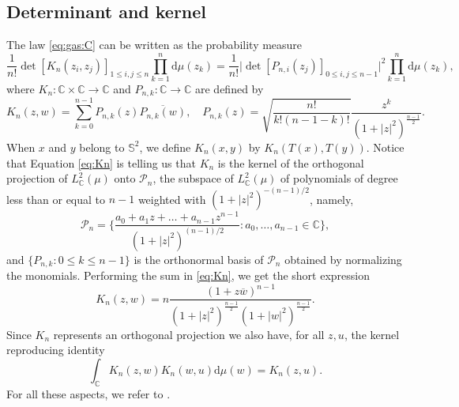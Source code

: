 \documentclass[10pt,reqno]{amsart}
\numberwithin{equation}{section}
\numberwithin{figure}{section}
\theoremstyle{plain}
\newcommand{\<}{\langle}
\renewcommand{\>}{\rangle}
\begin{document}
\subsection{Determinant and kernel}

The law \eqref{eq:gas:C} can be written as the probability measure
\begin{equation}
  \frac{1}{n!}\det{[K_n(z_i,z_j)]}_{1\leq i,j\leq n}\prod_{k=1}^n\mathrm{d}\mu(z_k)
  =
  \frac{1}{n!} 
  \Big|
  \det{[P_{n,i}(z_j)]}_{0\leq i,j\leq n-1}
  \Big|^2\prod_{k=1}^n\mathrm{d}\mu(z_k),
\end{equation}
where $K_n: \mathbb C \times \mathbb C \to \mathbb C$
and $P_{n,k}: \mathbb C \to \mathbb C$ are defined by
\begin{equation}\label{eq:Kn}
  K_n(z,w)=\sum_{k=0}^{n-1}
  P_{n,k}(z)\overline{P_{n,k}(w)},
  \quad
  P_{n,k}(z)=\sqrt{\frac{n!}{k!(n-1-k)!}}\frac{z^k}{(1+|z|^2)^{\frac{n-1}{2}}}.
\end{equation}
When $x$ and $y$ belong to $\mathbb S^2$,
we define $K_n(x,y)$
by $K_n(T(x),T(y))$.
Notice that Equation \eqref{eq:Kn} 
is telling us that $K_n$ is the kernel of 
the orthogonal projection
of $L^2_{\mathbb{C}}(\mu)$ onto $\mathcal P_n$,
the subspace of $L^2_{\mathbb{C}}(\mu)$ of polynomials of degree less than or equal to $n-1$ weighted with
	$(1+|z|^2)^{-(n-1)/2}$, namely,
\begin{equation}\label{eq:Pn}
    \mathcal P_n = 
    \bigg\{\frac{a_0 + a_1 z+ \dots + a_{n-1}z^{n-1}}{(1+|z|^2)^{(n-1)/2}}:
	a_0,\dots,a_{n-1} \in \mathbb C\bigg\},
\end{equation}
and $\{P_{n,k}: 0 \leq k \leq n-1 \}$ is the orthonormal
basis of $\mathcal P_n$ obtained by normalizing
the monomials. Performing the sum in \eqref{eq:Kn}, we get the short expression
\begin{equation}
  K_n(z,w) = n\frac{(1+z\overline w)^{n-1}}{(1+|z|^2)^{\frac{n-1}{2}}(1+|w|^2)^{\frac{n-1}{2}}}.
\end{equation}
Since $K_n$ represents an orthogonal projection
we also have, for all $z,u$, the kernel reproducing identity
\begin{equation}\label{eq:Kn:repro}
\int_{\mathbb{C}} K_n(z,w)K_n(w,u)\mathrm{d}\mu(w)=K_n(z,u).
\end{equation}
For all these aspects, we refer to \cite{MR2552864}.
\end{document}
